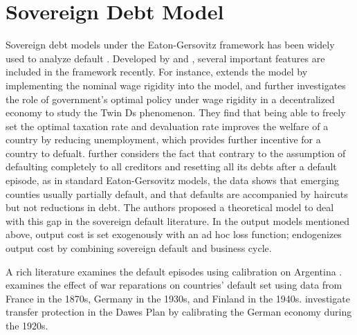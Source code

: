 \section*{Sovereign Debt Model}
Sovereign debt models under the Eaton-Gersovitz framework has been widely used to analyze default \citep*{Eaton-Gersovitz-81}.
Developed by \citet{Aguiar-Gopinath-06} and \citet{Arellano-08},
several important features are included in the framework recently.
For instance,
\citet{Schmitt-Uribe-16} extends the model by implementing the nominal wage rigidity into the model, and \citet{Na-18} further investigates the role of government's optimal policy under wage rigidity in a decentralized economy to study the Twin Ds phenomenon. They find that being able to freely set the optimal taxation rate and devaluation rate improves the welfare of a country by reducing unemployment, which provides further incentive for a country to defualt.
\citet{Arellano-23-partial-default} further considers the fact that contrary to the assumption of defaulting completely to all creditors and resetting all its debts after a default episode, as in standard Eaton-Gersovitz models, the data shows that emerging counties usually partially default, and that defaults are accompanied by haircuts but not reductions in debt. The authors proposed a theoretical model to deal with this gap in the sovereign default literature.
In the output models mentioned above, output cost is set exogenously with an ad hoc loss function; \citet*{Mendoza-Yue-12} endogenizes output cost by combining sovereign default and business cycle.

A rich literature examines the default episodes using calibration on Argentina \citep{Arellano-08, Schmitt-Uribe-16,Mendoza-Yue-12,Na-18}. \citet*{Hinrichsen_2020-chapter4} examines the effect of war reparations on countries' default set using data from France in the 1870s, Germany in the 1930s, and Finland in the 1940s. \citet*{Ho-Ritschl-23} investigate transfer protection in the Dawes Plan by calibrating the German economy during the 1920s.